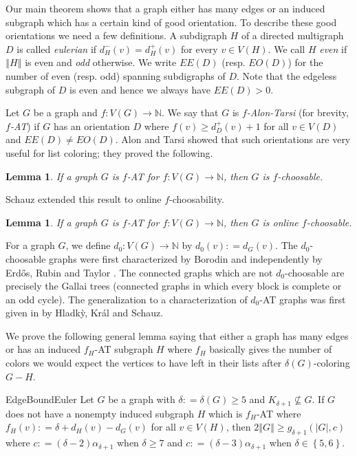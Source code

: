 \documentclass[12pt]{article}
\theoremstyle{plain}
\newtheorem{lem}[thm]{Lemma}
\theoremstyle{definition}
\theoremstyle{remark}
\newcommand{\IN}{\mathbb{N}}
\newcommand{\set}[1]{\left\{ #1 \right\}}
\newcommand{\card}[1]{\left|#1\right|}
\newcommand{\size}[1]{\left\Vert#1\right\Vert}
\newcommand{\func}[3]{#1\colon #2 \rightarrow #3}
\newcommand{\DefinedAs}{\mathrel{\mathop:}=}
\begin{document}
Our main theorem shows that a graph either has many edges or an induced subgraph which has a certain kind of good orientation.  To describe these good orientations we need a few definitions. A subdigraph $H$ of a directed multigraph $D$ is called \emph{eulerian} if $d^-_H(v) = d^+_H(v)$ for every $v \in V(H)$.  We call $H$ \emph{even} if $\size{H}$ is even and \emph{odd} otherwise.  We write $EE(D)$ (resp. $EO(D)$) for the number of even (resp. odd) spanning subdigraphs of $D$.  Note that the edgeless subgraph of $D$ is even and hence we always have $EE(D) > 0$.

Let $G$ be a graph and $\func{f}{V(G)}{\IN}$.  We say that $G$ is \emph{$f$-Alon-Tarsi} (for brevity, \emph{$f$-AT}) if $G$ has an orientation $D$ where $f(v) \geq d_{D}^+(v) + 1$ for all $v \in V(D)$ and $EE(D) \neq EO(D)$.  Alon and Tarsi \cite{Alon1992125} showed that such orientations are very useful for list coloring; they proved the following.

\begin{lem}\label{AlonTarsi}
If a graph $G$ is $f$-AT for $\func{f}{V(G)}{\IN}$, then $G$ is $f$-choosable.
\end{lem}

\noindent Schauz \cite{schauz2010flexible} extended this result to online $f$-choosability.

\begin{lem}\label{Schauz}
If a graph $G$ is $f$-AT for $\func{f}{V(G)}{\IN}$, then $G$ is online $f$-choosable.
\end{lem}

For a graph $G$, we define $\func{d_0}{V(G)}{\IN}$ by $d_0(v) \DefinedAs d_G(v)$.  The $d_0$-choosable graphs were first characterized by Borodin \cite{borodin1977criterion} and independently by Erd\H{o}s, Rubin and Taylor \cite{erdos1979choosability}.  The connected graphs which are not $d_0$-choosable are precisely the Gallai trees (connected graphs in which every block is complete or an odd cycle). The generalization to a characterization of $d_0$-AT graphs was first given in \cite{Hladky} by Hladk{\`y}, Kr{\'a}l and Schauz. 

We prove the following general lemma saying that either a graph has many edges or has an induced $f_H$-AT subgraph $H$ where $f_H$ basically gives the number of colors we would expect the vertices to have left in their lists after $\delta(G)$-coloring $G-H$. 

\begin{repthm}{EdgeBoundEuler}
Let $G$ be a graph with $\delta \DefinedAs \delta(G) \geq 5$ and $K_{\delta + 1} \not \subseteq G$. If $G$ does not have a nonempty induced subgraph $H$ which is $f_H$-AT where $f_H(v) \DefinedAs \delta + d_H(v) - d_G(v)$ for all $v \in V(H)$, then $2\size{G} \geq g_{\delta+1}(\card{G}, c)$ where $c \DefinedAs (\delta-2)\alpha_{\delta + 1}$ when $\delta \geq 7$ and $c \DefinedAs (\delta-3)\alpha_{\delta + 1}$ when $\delta \in \set{5,6}$.
\end{repthm}
\end{document}
